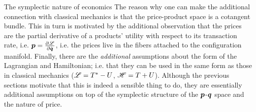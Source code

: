 \begin{econ}{The symplectic nature of economics}
    The reason why one can make the additional connection with classical mechanics is that the price-product space is a cotangent bundle. This in turn is motivated by the additional observation that the prices are the partial derivative of a products' utility with respect to its transaction rate, i.e. $\vb*{p} = \pdv{\ensuremath{\mathscr{L}}}{\ensuremath{\dot{\vb*{q}}}}$, i.e. the prices live in the fibers attached to the configuration manifold. Finally, there are the \emph{additional} assumptions about the form of the Lagrangian and Hamiltonian; i.e. that they can be used in the same form as those in classical mechanics ($\mathscr{L} = T^* - U$, $\mathscr{H} = T + U$). Although the previous sections motivate that this is indeed a sensible thing to do, they are essentially additional assumptions on top of the symplectic structure of the $\vb*{p}$-$\vb*{q}$ space and the nature of price. 
\end{econ}

